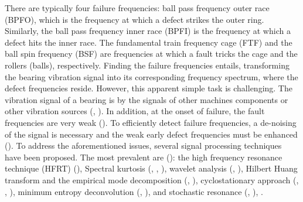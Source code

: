 \documentclass[../Main/thesis.tex]{subfiles}
\begin{document}
\justify
There are typically four failure frequencies: ball pass frequency outer race (BPFO), which is the frequency at which a defect strikes the outer ring. Similarly, the ball pass frequency inner race (BPFI) is the frequency at which a defect hits the inner race. The fundamental train frequency cage (FTF) and the ball spin frequency (BSF) are frequencies at which a fault tricks the cage and the rollers (balls), respectively.
\justify
Finding the failure frequencies entails, transforming the bearing vibration signal into its corresponding frequency spectrum, where the defect frequencies reside. However, this apparent simple task is challenging. The vibration signal of a bearing is  by the signals of other machines components or other vibration sources (\cite{zhao2014}, \cite{mcfadden1984a}). In addition, at the onset of failure, the fault frequencies are very weak (\cite{zhao2014}). To efficiently detect failure frequencies, a de-noising of the signal is necessary and the weak early defect frequencies must be enhanced (\cite{zhao2014}). 
\justify
To address the aforementioned issues, several signal processing techniques have been proposed. The most prevalent are (\cite{zhao2014}): the high frequency resonance technique (HFRT) (\cite{darlow1974}), Spectral kurtosis (\cite{antoni2006a}, \cite{antoni2006b}, \cite{antoni2007}), wavelet analysis (\cite{lin2000}, \cite{qiu2006}), Hilbert Huang transform and the empirical mode decomposition (\cite{yu2005}, \cite{lei2011}), cyclostationary approach (\cite{antoni2004}, \cite{borghesani2013}, \cite{girondin2013}), minimum entropy deconvolution (\cite{sawalhi2007}, \cite{jiang2013} ), and stochastic resonance (\cite{tan2009}, \cite{he2012}), .
\end{document}
